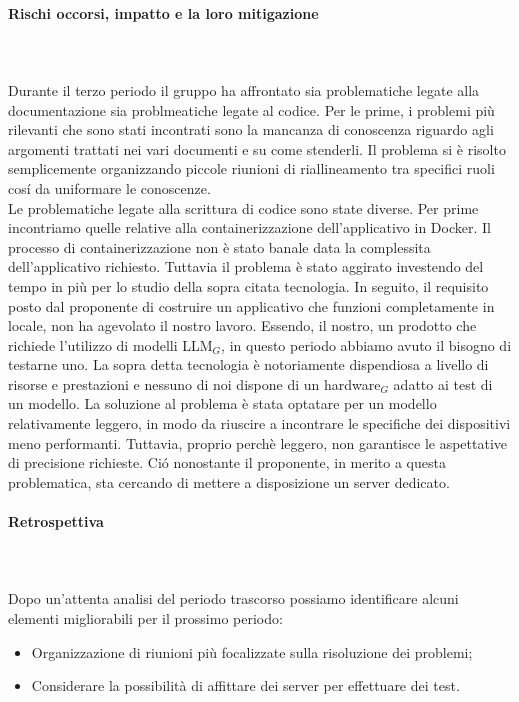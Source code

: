 \paragraph{Rischi occorsi, impatto e la loro mitigazione} \hspace{1cm} 
\\ \hspace{1cm} \\
Durante il terzo periodo il gruppo ha affrontato sia problematiche legate alla documentazione sia problmeatiche legate al codice. Per le prime, i problemi più rilevanti che sono stati incontrati sono la mancanza di conoscenza riguardo agli argomenti trattati nei vari documenti e su come stenderli. Il problema si è risolto semplicemente organizzando piccole riunioni di riallineamento tra specifici ruoli cosí da uniformare le conoscenze. \\
Le problematiche legate alla scrittura di codice sono state diverse. Per prime incontriamo quelle relative alla containerizzazione dell'applicativo in Docker. Il processo di containerizzazione non è stato banale data la complessita dell'applicativo richiesto. Tuttavia il problema è stato aggirato investendo del tempo in più per lo studio della sopra citata tecnologia. In seguito, il requisito posto dal proponente di costruire un applicativo che funzioni completamente in locale, non ha agevolato il nostro lavoro. Essendo, il nostro, un prodotto che richiede l'utilizzo di modelli LLM$_G$, in questo periodo abbiamo avuto il bisogno di testarne uno. La sopra detta tecnologia è notoriamente dispendiosa a livello di risorse e prestazioni e nessuno di noi dispone di un hardware$_G$ adatto ai test di un modello. La soluzione al problema è stata optatare per un modello relativamente leggero, in modo da riuscire a incontrare le specifiche dei dispositivi meno performanti. Tuttavia, proprio perchè leggero, non garantisce le aspettative di precisione richieste. Ció nonostante il proponente, in merito a questa problematica, sta cercando di mettere a disposizione un server dedicato.

\paragraph{Retrospettiva} \hspace{1cm} 
\\ \hspace{1cm} \\
Dopo un'attenta analisi del periodo trascorso possiamo identificare alcuni elementi migliorabili per il prossimo periodo:
\begin{itemize}
    \item Organizzazione di riunioni più focalizzate sulla risoluzione dei problemi;
    \item Considerare la possibilità di affittare dei server per effettuare dei test.
\end{itemize}

